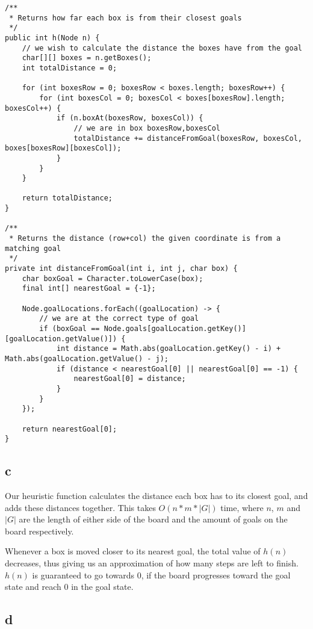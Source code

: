\documentclass[12pt]{article}
\begin{document}
\begin{lstlisting}
/**
 * Returns how far each box is from their closest goals
 */
public int h(Node n) {
    // we wish to calculate the distance the boxes have from the goal
    char[][] boxes = n.getBoxes();
    int totalDistance = 0;

    for (int boxesRow = 0; boxesRow < boxes.length; boxesRow++) {
        for (int boxesCol = 0; boxesCol < boxes[boxesRow].length; boxesCol++) {
            if (n.boxAt(boxesRow, boxesCol)) {
                // we are in box boxesRow,boxesCol
                totalDistance += distanceFromGoal(boxesRow, boxesCol, boxes[boxesRow][boxesCol]);
            }
        }
    }

    return totalDistance;
}

/**
 * Returns the distance (row+col) the given coordinate is from a matching goal
 */
private int distanceFromGoal(int i, int j, char box) {
    char boxGoal = Character.toLowerCase(box);
    final int[] nearestGoal = {-1};

    Node.goalLocations.forEach((goalLocation) -> {
        // we are at the correct type of goal
        if (boxGoal == Node.goals[goalLocation.getKey()][goalLocation.getValue()]) {
            int distance = Math.abs(goalLocation.getKey() - i) + Math.abs(goalLocation.getValue() - j);
            if (distance < nearestGoal[0] || nearestGoal[0] == -1) {
                nearestGoal[0] = distance;
            }
        }
    });

    return nearestGoal[0];
}
\end{lstlisting}

\subsection{c}
\label{sub:c}

Our heuristic function calculates the distance each box has to its closest goal, and adds these distances together. This takes $O(n*m*|G|)$ time, where $n$, $m$ and $|G|$ are the length of either side of the board and the amount of goals on the board respectively.

Whenever a box is moved closer to its nearest goal, the total value of $h(n)$ decreases, thus giving us an approximation of how many steps are left to finish. $h(n)$ is guaranteed to go towards 0, if the board progresses toward the goal state and reach 0 in the goal state.

\subsection{d}
\label{sub:d}
\end{document}
